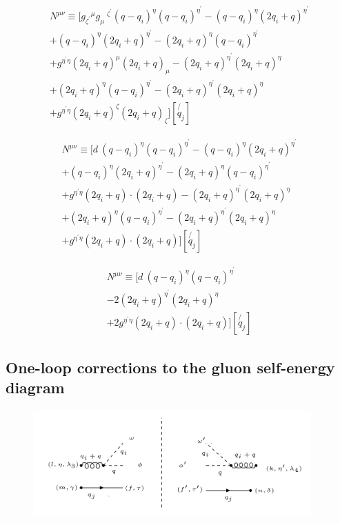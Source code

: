 \begin{equation}
\begin{split}
N^{\mu \nu}\equiv 
[ {g_{{{\zeta}^{\prime}}}}^{\mu}{g_{{\mu}}\:^{{\zeta}^{\prime}}}(q-q_i)^{\eta}(q-q_i)^{{\eta}^{\prime}}
-(q-q_i)^{\eta}(2q_i +q)^{{\eta}^{\prime}}\\
+(q-q_i)^{\eta}(2q_i +q)^{{\eta}^{\prime}}-(2q_i +q)^{\eta}(q-q_i)^{{\eta}^{\prime}}\\
+g^{{{\eta}^{\prime}}{\eta}} (2q_i +q)^{\mu}(2q_i +q)_{\mu}-(2q_i +q)^{\eta^{\prime}}(2q_i +q)^{{\eta}}\\
+(2q_i +q)^{\eta}(q-q_i)^{{\eta}^{\prime}}-(2q_i +q)^{\eta^{\prime}}(2q_i +q)^{{\eta}}\\
+g^{{{\eta}^{\prime}}{\eta}} (2q_i +q)^{\zeta}(2q_i +q)_{{\zeta}}][\not{q_j}]
\end{split}
\end{equation}

\begin{equation}
\begin{split}
N^{\mu \nu}\equiv 
[ d\:(q-q_i)^{\eta}(q-q_i)^{{\eta}^{\prime}}
-(q-q_i)^{\eta}(2q_i +q)^{{\eta}^{\prime}}\\
+(q-q_i)^{\eta}(2q_i +q)^{{\eta}^{\prime}}-(2q_i +q)^{\eta}(q-q_i)^{{\eta}^{\prime}}\\
+g^{{{\eta}^{\prime}}{\eta}} (2q_i +q)\cdot(2q_i +q)-(2q_i +q)^{\eta^{\prime}}(2q_i +q)^{{\eta}}\\
+(2q_i +q)^{\eta}(q-q_i)^{{\eta}^{\prime}}-(2q_i +q)^{\eta^{\prime}}(2q_i +q)^{{\eta}}\\
+g^{{{\eta}^{\prime}}{\eta}} (2q_i +q)\cdot(2q_i +q)][\not{q_j}]
\end{split}
\end{equation}

\begin{equation}
\begin{split}
N^{\mu \nu}\equiv [ d\:(q-q_i)^{\eta}(q-q_i)^{{\eta}^{\prime}}\\
-2(2q_i +q)^{\eta^{\prime}}(2q_i +q)^{{\eta}}\\
+2g^{{{\eta}^{\prime}}{\eta}} (2q_i +q)\cdot(2q_i +q)][\not{q_j}]
\end{split}
\end{equation}
\pagebreak
\subsection{One-loop corrections to the gluon self-energy diagram}
\begin{figure}[h!]
\centering
\includegraphics[width=0.95\textwidth]{images/ghostM1squer.png}
\end{figure}






